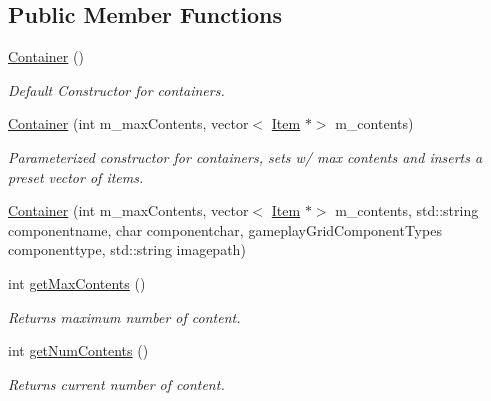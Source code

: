 \subsection*{Public Member Functions}
\begin{DoxyCompactItemize}
\item 
\hypertarget{class_container_a1b0c5515d6863c1bc98cc93b65952f42}{}\label{class_container_a1b0c5515d6863c1bc98cc93b65952f42} 
\hyperlink{class_container_a1b0c5515d6863c1bc98cc93b65952f42}{Container} ()
\begin{DoxyCompactList}\small\item\em Default Constructor for containers. \end{DoxyCompactList}\item 
\hyperlink{class_container_adf46b339e71f73d1b29ba0ba628477d9}{Container} (int m\+\_\+max\+Contents, vector$<$ \hyperlink{class_item}{Item} $\ast$$>$ m\+\_\+contents)
\begin{DoxyCompactList}\small\item\em Parameterized constructor for containers, sets w/ max contents and inserts a preset vector of items. \end{DoxyCompactList}\item 
\hyperlink{class_container_ab7f8067097f7f58cb1b251069af3c8ad}{Container} (int m\+\_\+max\+Contents, vector$<$ \hyperlink{class_item}{Item} $\ast$$>$ m\+\_\+contents, std\+::string componentname, char componentchar, gameplay\+Grid\+Component\+Types componenttype, std\+::string imagepath)
\item 
\hypertarget{class_container_a3edf03e1eca2c48a22bc6073efb6ab5c}{}\label{class_container_a3edf03e1eca2c48a22bc6073efb6ab5c} 
int \hyperlink{class_container_a3edf03e1eca2c48a22bc6073efb6ab5c}{get\+Max\+Contents} ()
\begin{DoxyCompactList}\small\item\em Returns maximum number of content. \end{DoxyCompactList}\item 
\hypertarget{class_container_a9f10a0e0db5965080c21f290faee29b0}{}\label{class_container_a9f10a0e0db5965080c21f290faee29b0} 
int \hyperlink{class_container_a9f10a0e0db5965080c21f290faee29b0}{get\+Num\+Contents} ()
\begin{DoxyCompactList}\small\item\em Returns current number of content. \end{DoxyCompactList}\item 
\hypertarget{class_container_a31016cf32f3c5cee711504ccc461b336}{}\label{class_container_a31016cf32f3c5cee711504ccc461b336} 

\end{DoxyCompactItemize}
